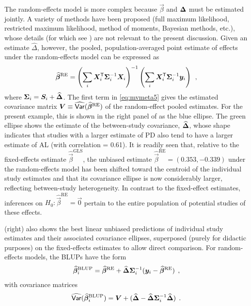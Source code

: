 The random-effects model is more complex because $\vec{\beta}$ and $\bm{\Delta}$ must be estimated jointly.
A variety of methods have been proposed (full maximum likelihood, restricted maximum likelihood, method of
moments, Bayesian methods, etc.), whose details (for which see \citealp{Jackson-etal:2011}) are not relevant to the present discussion.
Given an estimate $\widehat{\Delta}$, however, the pooled, population-averaged point estimate of effects under the
random-effects model can be expressed as
\begin{equation} \label{eq:mvmeta5}
\widehat{\bm{\beta}}^{\textrm{RE}} = \left(\sum_i \bm{X}_i^\mathsf{T}  \bm{\Sigma}_i^{-1} \bm{X}_i  \right)^{-1}
                                      \left(\sum_i \bm{X}_i^\mathsf{T}  \bm{\Sigma}_i^{-1} \bm{y}_i \right) \:\: ,
\end{equation}
where $\bm{\Sigma}_i = \bm{S}_i + \widehat{\bm{\Delta}}$.
The first term in \eqref{eq:mvmeta5} gives the estimated covariance matrix $\bm{V} \equiv \widehat{\mathsf{Var}}(\widehat{\bm{\beta}}^{\textrm{RE}})$
of the random-effect pooled estimates.
For the present example, this is shown in the right panel of  as the blue ellipse.  The green ellipse shows the
estimate of the between-study covariance, $\widehat{\bm{\Delta}}$, whose shape indicates that studies with a larger estimate
of PD also tend to have a larger estimate of AL (with correlation = 0.61).
It is readily seen that, relative to
the fixed-effects estimate $\widehat{\vec{\beta}}^{\textrm{GLS}}$,
the unbiased estimate $\widehat{\vec{\beta}}^{\textrm{RE}} = (0.353, -0.339)$
under the random-effects model
has been shifted toward the centroid of the individual study estimates
and that its covariance ellipse is now considerably larger, reflecting between-study heterogeneity.
In contrast to the fixed-effect estimates, inferences on $H_0 : \widehat{\vec{\beta}}^{\textrm{RE}} = \vec{0}$
pertain to the entire population of potential studies of these effects.

 (right) also shows the best linear unbiased predictions of individual study estimates
and their associated covariance ellipses, superposed (purely for didactic purposes)
on the fixed-effects estimates to allow direct comparison.
For random-effects models, the BLUPs have the form
\begin{equation} \label{eq:mvmeta6}
\widehat{\bm{\beta}}_i^{\textrm{BLUP}} = \widehat{\bm{\beta}}^{\textrm{RE}} + \widehat{\bm{\Delta}}  \bm{\Sigma}_i^{-1} (\bm{y}_i - \widehat{\bm{\beta}}^{\textrm{RE}}) \:\: ,
\end{equation}
with covariance matrices
\begin{equation} \label{eq:mvmeta7}
\widehat{\mathsf{Var}}(\widehat{\bm{\beta}}_i^{\textrm{BLUP}}) = \bm{V} + (\widehat{\bm{\Delta}} - \widehat{\bm{\Delta}}  \bm{\Sigma}_i^{-1} \widehat{\bm{\Delta}})
\:\: .
\end{equation}


